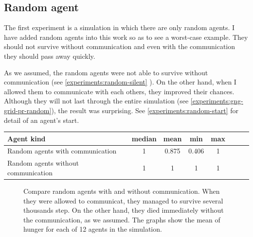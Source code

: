 \clearpage

\subsection{Random agent}   

The first experiment is a simulation in which there are only random agents. I have added random agents into this work so as to see a worst-case example. They should not survive without communication and even with the communication they should pass away quickly.

As we assumed, the random agents were not able to survive without communication (see \ref{experiments:random-silent} ). On the other hand, when I allowed them to communicate with each others, they improved their chances. Although they will not last through the entire simulation (see \ref{experiments:gng-grid-pr-random}), the result was surprising. See \ref{experiments:random-start} for detail of an agent's start.

\begin{center}   
  \begin{tabular}{l*{6}{c}r}
  Agent kind        & median & mean & min & max \\
  \hline  
  Random agents with communication     & 1 & 0.875 & 0.406 & 1  \\
  Random agents without communication    & 1 & 1 & 1 & 1  \\
  \end{tabular}                  
\end{center}


\begin{figure}[h!]
  \centering      
  \caption{Compare random agents with and without communication. When they were allowed to communicat, they managed to survive several thousands step. On the other hand, they died immediately without the communication, as we assumed. The graphs show the mean of hunger for each of 12 agents in the simulation.}
\end{figure} 

